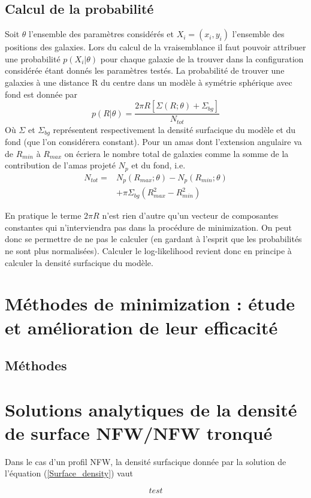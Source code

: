 \documentclass[a4paper,11pt]{article}
\numberwithin{equation}{section}
\begin{document}
\begin{multicols}{2}
    \subsection{Calcul de la probabilité}
    Soit $\theta$ l'ensemble des paramètres considérés et $ X_i = (x_i , y_i)$ l'ensemble des positions des galaxies. Lors du calcul de la vraisemblance il faut pouvoir attribuer une probabilité $p(X_i | \theta)$ pour chaque galaxie de la trouver dans la configuration considérée étant donnés les paramètres testés.
La probabilité de trouver une galaxies à une distance R du centre dans un modèle à symétrie sphérique avec fond est donnée par\cite{Mamon2010}
    \begin{equation}
      \label{Prob_uv}
      p(R | \theta) =  \frac{2\pi R [ \Sigma (R ; \theta ) + \Sigma_{bg} ]}{N_{tot}}
    \end{equation}
    Où $\Sigma$ et $\Sigma_{bg}$ représentent respectivement la densité surfacique du modèle et du fond (que l'on considérera constant). Pour un amas dont l'extension angulaire va de $R_{min}$ à $R_{max}$ on écriera le nombre total de galaxies comme la somme de la contribution de l'amas projeté $N_p$ et du fond, i.e.
    \begin{equation}
      \label{N_tot}
      \begin{split}
        N_{tot} =  & N_p (R_{max} ; \theta) - N_p (R_{min} ; \theta) \\
                   & + \pi \Sigma_{bg} (R_{max}^2 - R_{min}^2 )
      \end{split}
    \end{equation}

  En pratique le terme $2\pi R$ n'est rien d'autre qu'un vecteur de composantes constantes qui n'interviendra pas dans la procédure de minimization. On peut donc se permettre de ne pas le calculer (en gardant à l'esprit que les probabilités ne sont plus normalisées).\newline
  Calculer le log-likelihood revient donc en principe à calculer la densité surfacique du modèle.
  
  \newpage
  \section{Méthodes de minimization : étude et amélioration de leur efficacité}
  \subsection{Méthodes}
  
\end{multicols}
\newpage



\newpage
\appendix
\section{Solutions analytiques de la densité de surface NFW/NFW tronqué}
Dans le cas d'un profil NFW, la densité surfacique donnée par la solution de l'équation (\ref{Surface_density}) vaut\cite{Lokas2001}

  \begin{equation}
    test  
  \end{equation}
\end{document}
